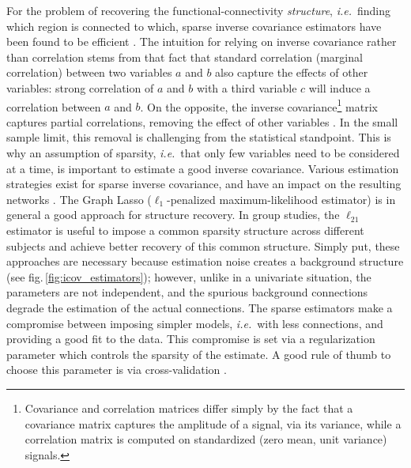 \documentclass[5p]{elsarticle}
\begin{document}
For the problem of recovering the functional-connectivity
\emph{structure}, \emph{i.e.}\ finding which region is connected to
which, sparse inverse covariance estimators have been found to be
efficient \cite{varoquaux2010c,smith2011,ryali2012}. The intuition for relying on
inverse covariance rather than correlation stems from that fact that
standard correlation (marginal correlation) between two variables $a$ and
$b$ also capture the effects of other variables: strong correlation of
$a$ and $b$ with a third variable $c$ will induce a correlation between
$a$ and $b$. On the opposite, the inverse covariance\footnote{Covariance
and correlation matrices differ simply by the fact that a covariance
matrix captures the amplitude of a signal, via its variance, while a
correlation matrix is computed on standardized (zero mean, unit variance) signals.}
matrix captures
partial correlations, removing the effect of other variables
\cite{marrelec2006a}. In the small sample limit, this removal is
challenging from the statistical standpoint. This is why an assumption 
of sparsity,
\emph{i.e.}\ that only few variables need to be considered at a time, is
important to estimate a good inverse covariance. Various estimation
strategies exist for sparse inverse covariance, and have an impact on the
resulting networks \cite{varoquaux2012,varoquaux2010c}. The
Graph Lasso ($\ell_1$-penalized maximum-likelihood estimator)
\cite{friedman2008} is in general a good approach for structure recovery. In group studies,
the $\ell_{21}$ estimator \cite{varoquaux2010c,honorio2012} is useful to
impose a common sparsity structure across different subjects and achieve
better recovery of this common structure. Simply put, these approaches
are necessary because estimation noise creates a background structure
(see fig.\,\ref{fig:icov_estimators}); however, unlike in a univariate situation, the
parameters are not independent, and the spurious background connections
degrade the estimation of the actual connections. The sparse estimators
make a compromise between imposing simpler models, \emph{i.e.}\ with less
connections, and providing a good fit to the data. This compromise is set via a
regularization parameter which controls the sparsity of the estimate. A
good rule of thumb to choose this parameter is via cross-validation
\cite{varoquaux2010c}.

\end{document}
